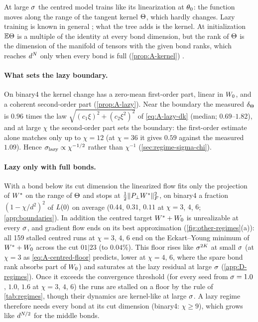 At large $\sigma$ the centred model trains like its linearization at $\theta_0$: the function moves along the range
of the tangent kernel $\Theta$, which hardly changes. Lazy training is known in general
; what the tree adds is the kernel. At
initialization $\mathbb{E}\Theta$ is a multiple of the identity at every bond dimension, but the rank of $\Theta$ is the dimension
of the manifold of tensors with the given bond ranks, which reaches $d^N$ only when every bond is full
(\cref{prop:A-kernel}) \proven{} 
.

\paragraph{What sets the lazy boundary.}
\derived{} \empirical{} On binary4 the kernel change has a zero-mean first-order part, linear in $W_{0}$, and a
coherent second-order part (\cref{prop:A-lazy}). Near the boundary the measured $\delta_{\Theta}$ is $0.96$ times the law
$\sqrt{(c_1\xi)^2+(c_2\xi^2)^2}$ of \eqref{eq:A-lazy-dk} (median; $0.69$--$1.82$), and at large $\chi$ the
second-order part sets the boundary: the first-order estimate alone matches only up to $\chi=12$ (at $\chi=36$ it
gives $0.59$ against the measured $1.09$). Hence $\sigma_{\rm lazy}\propto\chi^{-1/2}$ rather than $\chi^{-1}$
(\cref{sec:regime-sigma-chi}).

\paragraph{Lazy only with full bonds.}
\derived{} \empirical{}  With a bond below its
cut dimension the linearized flow fits only the projection of $W^{*}$ on the range of $\Theta$ and stops at
$\frac12\lVert P_\perp W^{*}\rVert_{F}^2$, on binary4 a fraction $(1-\chi/d^2)^2$ of $L(0)$ on average ($0.44$, $0.31$,
$0.11$ at $\chi=3$, $4$, $6$; \cref{app:boundaries}). In addition the centred target $W^{*}+W_{0}$ is unrealizable at
every $\sigma$, and gradient flow ends on its best approximation (\cref{fig:other-regimes}(a)): all 159 stalled
centred runs at $\chi=3$, $4$, $6$ end on the Eckart--Young minimum of $W^{*}+W_{0}$ across the cut $01|23$ (to
$0.04\%$). This floor rises like $\sigma^{2K}$ at small $\sigma$ (at $\chi=3$ as \eqref{eq:A-centred-floor} predicts,
lower at $\chi=4$, $6$, where the spare bond rank absorbs part of $W_{0}$) and saturates at the lazy residual at large
$\sigma$ (\cref{app:D-regimes}). Once it exceeds the convergence threshold (for every seed from $\sigma=1.0$, $1.0$, $1.6$
at $\chi=3$, $4$, $6$) the runs are stalled on a floor by the rule of \cref{tab:regimes}, though their dynamics are
kernel-like at large $\sigma$. A lazy regime therefore needs every bond at its cut dimension (binary4: $\chi\ge9$),
which grows like $d^{N/2}$ for the middle bonds.

